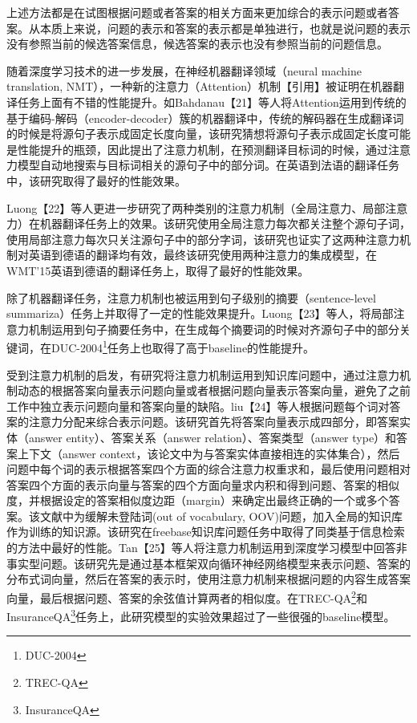 上述方法都是在试图根据问题或者答案的相关方面来更加综合的表示问题或者答案。从本质上来说，问题的表示和答案的表示都是单独进行，也就是说问题的表示没有参照当前的候选答案信息，候选答案的表示也没有参照当前的问题信息。

随着深度学习技术的进一步发展，在神经机器翻译领域（neural machine translation, NMT），一种新的注意力（Attention）机制【引用】被证明在机器翻译任务上面有不错的性能提升。如Bahdanau【21】等人将Attention运用到传统的基于编码-解码（encoder-decoder）簇的机器翻译中，传统的解码器在生成翻译词的时候是将源句子表示成固定长度向量，该研究猜想将源句子表示成固定长度可能是性能提升的瓶颈，因此提出了注意力机制，在预测翻译目标词的时候，通过注意力模型自动地搜索与目标词相关的源句子中的部分词。在英语到法语的翻译任务中，该研究取得了最好的性能效果。

Luong【22】等人更进一步研究了两种类别的注意力机制（全局注意力、局部注意力）在机器翻译任务上的效果。该研究使用全局注意力每次都关注整个源句子词，使用局部注意力每次只关注源句子中的部分字词，该研究也证实了这两种注意力机制对英语到德语的翻译均有效，最终该研究使用两种注意力的集成模型，在WMT'15英语到德语的翻译任务上，取得了最好的性能效果。

除了机器翻译任务，注意力机制也被运用到句子级别的摘要（sentence-level summariza）任务上并取得了一定的性能效果提升。Luong【23】等人，将局部注意力机制运用到句子摘要任务中，在生成每个摘要词的时候对齐源句子中的部分关键词，在DUC-2004\footnote{DUC-2004}任务上也取得了高于baseline的性能提升。

受到注意力机制的启发，有研究将注意力机制运用到知识库问题中，通过注意力机制动态的根据答案向量表示问题向量或者根据问题向量表示答案向量，避免了之前工作中独立表示问题向量和答案向量的缺陷。liu【24】等人根据问题每个词对答案的注意力分配来综合表示问题。该研究首先将答案向量表示成四部分，即答案实体（answer entity）、答案关系（answer relation）、答案类型（answer type）和答案上下文（answer context，该论文中为与答案实体直接相连的实体集合），然后问题中每个词的表示根据答案四个方面的综合注意力权重求和，最后使用问题相对答案四个方面的表示向量与答案的四个方面向量求内积和得到问题、答案的相似度，并根据设定的答案相似度边距（margin）来确定出最终正确的一个或多个答案。该文献中为缓解未登陆词(out of vocabulary, OOV)问题，加入全局的知识库作为训练的知识源。该研究在freebase知识库问题任务中取得了同类基于信息检索的方法中最好的性能。Tan【25】等人将注意力机制运用到深度学习模型中回答非事实型问题。该研究先是通过基本框架双向循环神经网络模型来表示问题、答案的分布式词向量，然后在答案的表示时，使用注意力机制来根据问题的内容生成答案向量，最后根据问题、答案的余弦值计算两者的相似度。在TREC-QA\footnote{TREC-QA}和InsuranceQA\footnote{InsuranceQA}任务上，此研究模型的实验效果超过了一些很强的baseline模型。


